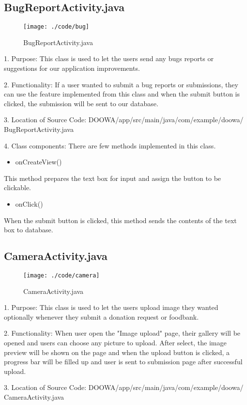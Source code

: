 \documentclass[conference]{IEEEtran}
\begin{document}
\subsection{BugReportActivity.java}
\begin{figure}[h!]
\texttt{[image: ./code/bug]}
\centering
\caption{BugReportActivity.java}
\end{figure}
1. Purpose: This class is used to let the users send any bugs reports or suggestions for our application improvements.\break
\par 2. Functionality: If a user wanted to submit a bug reports or submissions, they can use the feature implemented from this class and when the submit button is clicked, the submission will be sent to our database.\break

3. Location of Source Code: DOOWA/app/src/main/java/com/example/doowa/ BugReportActivity.java\break

4. Class components: There are few methods implemented in this class.
\begin{itemize}
\item onCreateView()
\end{itemize}
This method prepares the text box for input and assign the button to be clickable.
\begin{itemize}
\item onClick()
\end{itemize}
When the submit button is clicked, this method sends the contents of the text box to database.
\newpage
\subsection{CameraActivity.java}
\begin{figure}[h!]
\texttt{[image: ./code/camera]}
\centering
\caption{CameraActivity.java}
\end{figure}
1. Purpose: This class is used to let the users upload image they wanted optionally whenever they submit a donation request or foodbank.\break
\par 2. Functionality: When user open the "Image upload" page, their gallery will be opened and users can choose any picture to upload. After select, the image preview will be shown on the page and when the upload button is clicked, a progress bar will be filled up and user is sent to submission page after successful upload. \break

3. Location of Source Code: DOOWA/app/src/main/java/com/example/doowa/ CameraActivity.java\break
\end{document}
